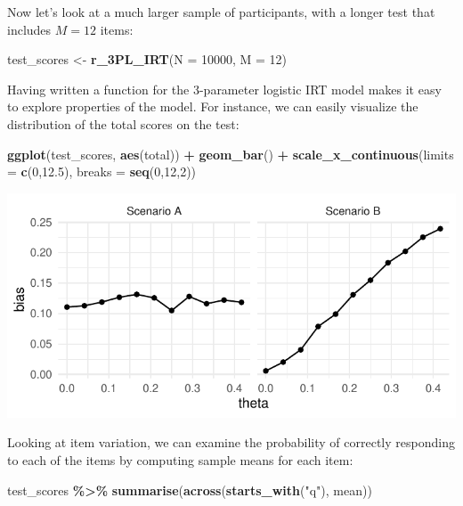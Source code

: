 \documentclass[
]{book}
\newenvironment{Shaded}{\begin{snugshade}}{\end{snugshade}}
\newcommand{\AttributeTok}[1]{\textcolor[rgb]{0.13,0.29,0.53}{#1}}
\newcommand{\DecValTok}[1]{\textcolor[rgb]{0.00,0.00,0.81}{#1}}
\newcommand{\FloatTok}[1]{\textcolor[rgb]{0.00,0.00,0.81}{#1}}
\newcommand{\FunctionTok}[1]{\textcolor[rgb]{0.13,0.29,0.53}{\textbf{#1}}}
\newcommand{\NormalTok}[1]{#1}
\newcommand{\OtherTok}[1]{\textcolor[rgb]{0.56,0.35,0.01}{#1}}
\newcommand{\SpecialCharTok}[1]{\textcolor[rgb]{0.81,0.36,0.00}{\textbf{#1}}}
\newcommand{\StringTok}[1]{\textcolor[rgb]{0.31,0.60,0.02}{#1}}
\begin{document}
Now let's look at a much larger sample of participants, with a longer test that includes \(M = 12\) items:

\begin{Shaded}
\begin{Highlighting}[]
\NormalTok{test\_scores }\OtherTok{\textless{}{-}} \FunctionTok{r\_3PL\_IRT}\NormalTok{(}\AttributeTok{N =} \DecValTok{10000}\NormalTok{, }\AttributeTok{M =} \DecValTok{12}\NormalTok{)}
\end{Highlighting}
\end{Shaded}

Having written a function for the 3-parameter logistic IRT model makes it easy to explore properties of the model.
For instance, we can easily visualize the distribution of the total scores on the test:

\begin{Shaded}
\begin{Highlighting}[]
\FunctionTok{ggplot}\NormalTok{(test\_scores, }\FunctionTok{aes}\NormalTok{(total)) }\SpecialCharTok{+} 
  \FunctionTok{geom\_bar}\NormalTok{() }\SpecialCharTok{+} 
  \FunctionTok{scale\_x\_continuous}\NormalTok{(}\AttributeTok{limits =} \FunctionTok{c}\NormalTok{(}\DecValTok{0}\NormalTok{,}\FloatTok{12.5}\NormalTok{), }\AttributeTok{breaks =} \FunctionTok{seq}\NormalTok{(}\DecValTok{0}\NormalTok{,}\DecValTok{12}\NormalTok{,}\DecValTok{2}\NormalTok{))}
\end{Highlighting}
\end{Shaded}

\begin{center}\includegraphics[width=0.75\linewidth]{Designing-Simulations-in-R_files/figure-latex/unnamed-chunk-91-1} \end{center}

Looking at item variation, we can examine the probability of correctly responding to each of the items by computing sample means for each item:

\begin{Shaded}
\begin{Highlighting}[]
\NormalTok{test\_scores }\SpecialCharTok{\%\textgreater{}\%}
  \FunctionTok{summarise}\NormalTok{(}\FunctionTok{across}\NormalTok{(}\FunctionTok{starts\_with}\NormalTok{(}\StringTok{"q"}\NormalTok{), mean))}
\end{Highlighting}
\end{Shaded}
\end{document}

